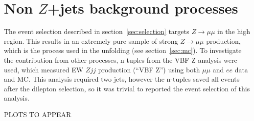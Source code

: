 \section{Non $Z$+jets background processes}
\label{app:bkg-processes}

The event selection described in section~\ref{sec:selection} targets $Z\to\mu\mu$ in the high \pTll{} region. This results in an extremely pure sample of strong $Z\to\mu\mu$ production, which is the process used in the unfolding (see section~\ref{sec:mc}). To investigate the contribution from other processes, n-tuples from the VBF-Z analysis were used, which measured EW $Zjj$ production (``VBF Z'') using both $\mu\mu$ and $ee$ data and MC. This analysis required two jets, however the n-tuples saved all events after the dilepton selection, so it was trivial to reported the event selection of this analysis. 

PLOTS TO APPEAR

